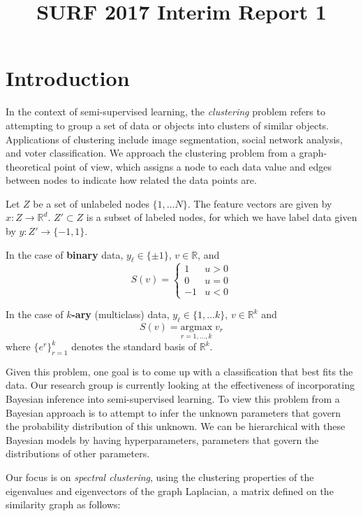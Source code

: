 \documentclass{siamart1116}
\title{SURF 2017 Interim Report 1}
\author{\TheAuthors}
\date{}
\begin{document}
\maketitle
\setlength{\unitlength}{1in}
\setlength{\parindent}{0in}

\section{Introduction}
In the context of semi-supervised learning, the \textit{clustering} problem refers to attempting to group a set of data or objects into clusters of similar objects. Applications of clustering include image segmentation, social network analysis, and voter classification. We approach the clustering problem from a graph-theoretical point of view, which assigns a node to each data value and edges between nodes to indicate how related the data points are.

Let $Z$ be a set of unlabeled nodes $\{1, \ldots N\}$. The feature vectors are given by $x : Z \rightarrow \mathbb{R}^d$. $Z' \subset Z$ is a subset of labeled nodes, for which we have label data given by $y : Z' \rightarrow \{-1, 1\}$.


In the case of {\bf binary} data, $y_\ell \in \{\pm 1\}$, $v \in \mathbb{R}$, and
\[
S(v) = \begin{cases}
1 & u>0\\
0 & u=0\\
-1 & u<0
\end{cases}
\]

In the case of {\bf $k$-ary} (multiclass) data, $y_\ell \in \{1, \ldots k\}$, $v \in \mathbb{R}^k$ and
\[
S(v) = \underset{r =1,\ldots,k}{\mathrm{argmax}}\;v_r
\]
where $\{e^r\}_{r=1}^k$ denotes the standard basis of $\mathbb{R}^k$.

Given this problem, one goal is to come up with a classification that best fits the data. Our research group is currently looking at the effectiveness of incorporating Bayesian inference into semi-supervised learning. To view this problem from a Bayesian approach is to attempt to infer the unknown parameters that govern the probability distribution of this unknown. We can be hierarchical with these Bayesian models by having hyperparameters, parameters that govern the distributions of other parameters.

Our focus is on \textit{spectral clustering}, using the clustering properties of the eigenvalues and eigenvectors of the graph Laplacian, a matrix defined on the similarity graph as follows:
\end{document}
